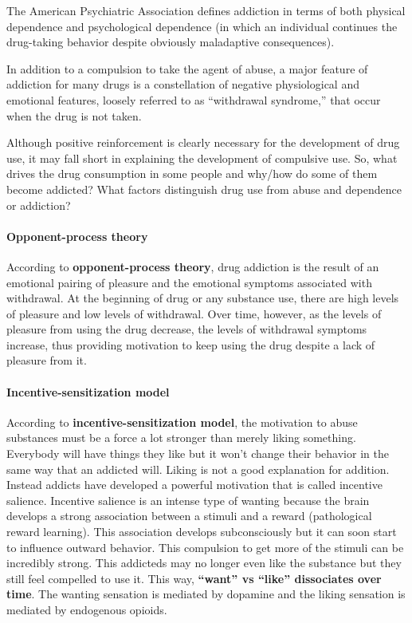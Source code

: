 \documentclass[12pt,article,oneside,a4paper]{memoir}
\begin{document}
The American Psychiatric Association defines addiction in terms of both physical dependence and psychological dependence (in which an individual continues the drug-taking behavior despite obviously maladaptive consequences).

In addition to a compulsion to take the agent of abuse, a major feature of addiction for many drugs is a constellation of negative physiological and emotional features, loosely referred to as “withdrawal syndrome,” that occur when the drug is not taken. 

Although positive reinforcement is clearly necessary for the development of drug use, it may fall short in explaining the development of compulsive use. So, what drives the drug consumption in some people and why/how do some of them become addicted? What factors distinguish drug use from abuse and dependence or addiction?

\paragraph{Opponent-process theory}
According to \textbf{opponent-process theory}, drug addiction is the result of an emotional pairing of pleasure and the emotional symptoms associated with withdrawal.
At the beginning of drug or any substance use, there are high levels of pleasure and low levels of withdrawal. Over time, however, as the levels of pleasure from using the drug decrease, the levels of withdrawal symptoms increase, thus providing motivation to keep using the drug despite a lack of pleasure from it.

\paragraph{Incentive-sensitization model}
According to \textbf{incentive-sensitization model}, the motivation to abuse substances must be a force a lot stronger than merely liking something. Everybody will have things they like but it won’t change their behavior in the same way that an addicted will. Liking is not a good explanation for addition. Instead addicts have developed a powerful motivation that is called incentive salience.
Incentive salience is an intense type of wanting because the brain develops a strong association between a stimuli and a reward (pathological reward learning). This association develops subconsciously but it can soon start to influence outward behavior. This compulsion to get more of the stimuli can be incredibly strong. This addicteds may no longer even like the substance but they still feel compelled to use it.
This way, \textbf{``want'' vs ``like'' dissociates over time}. The wanting sensation is mediated by dopamine and the liking sensation is mediated by endogenous opioids.
\end{document}
